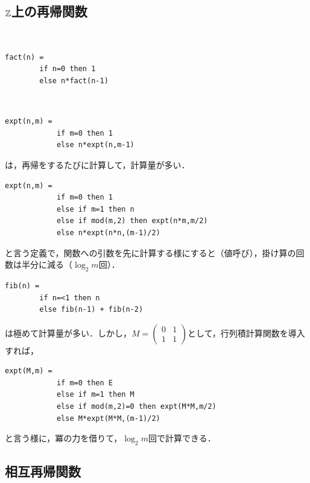 \documentclass[uplatex, dvipdfmx]{jsreport}
\begin{document}
\subsection{$\mathbb{Z}$上の再帰関数}

\begin{example}[階乗]　

\begin{lstlisting}[caption=factorial]
    fact(n) = 
        if n=0 then 1
        else n*fact(n-1)
\end{lstlisting}
\end{example}

\begin{example}[冪]　

    \begin{lstlisting}[caption=exponential]
        expt(n,m) = 
            if m=0 then 1
            else n*expt(n,m-1)
    \end{lstlisting}
    は，再帰をするたびに計算して，計算量が多い．
    \begin{lstlisting}[caption=exponential]
        expt(n,m) = 
            if m=0 then 1
            else if m=1 then n
            else if mod(m,2) then expt(n*m,m/2)
            else n*expt(n*n,(m-1)/2)
    \end{lstlisting}
    と言う定義で，関数への引数を先に計算する様にすると（値呼び），掛け算の回数は半分に減る（$\log_2m$回）．
\end{example}

\begin{example}
    
    \begin{lstlisting}[caption=fibonacci number]
    fib(n) = 
        if n=<1 then n
        else fib(n-1) + fib(n-2)
    \end{lstlisting}
    は極めて計算量が多い．しかし，$M=\begin{pmatrix}0&1\\1&1\end{pmatrix}$として，行列積計算関数を導入すれば，
    \begin{lstlisting}[caption=fibonacci number]
        expt(M,m) = 
            if m=0 then E
            else if m=1 then M
            else if mod(m,2)=0 then expt(M*M,m/2)
            else M*expt(M*M,(m-1)/2)
    \end{lstlisting}
    と言う様に，冪の力を借りて，$\log_2m$回で計算できる．
\end{example}

\subsection{相互再帰関数}
\end{document}
